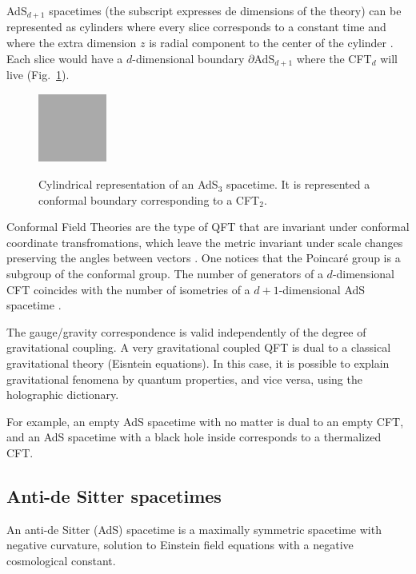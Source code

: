 \documentclass[twocolumn]{revtex4}
\begin{document}
AdS$_{d+1}$ spacetimes (the subscript expresses de dimensions of the theory) can be represented as cylinders where every slice corresponds to a constant time and where the extra dimension $z$ is radial component to the center of the cylinder \cite{}. Each slice would have a $d$-dimensional boundary $\partial$AdS$_{d+1}$ where the CFT$_d$ will live (Fig.~\ref{fig:AdS}).

\begin{figure}
    \centering
    \includegraphics[width=0.2\textwidth]{../Imatges/empty.png}
\label{fig:AdS}
\caption{Cylindrical representation of an AdS$_3$ spacetime. It is represented a conformal boundary corresponding to a CFT$_2$.}
\end{figure}

Conformal Field Theories are the type of QFT that are invariant under conformal coordinate transfromations, which leave the metric invariant under scale changes preserving the angles between vectors \cite{ginsparg_applied_1988}. One notices that the Poincaré group is a subgroup of the conformal group. The number of generators of a $d$-dimensional CFT coincides with the number of isometries of a $d+1$-dimensional AdS spacetime \cite{}.

The gauge/gravity correspondence is valid independently of the degree of gravitational coupling. A very gravitational coupled QFT is dual to a classical gravitational theory (Eisntein equations). In this case, it is possible to explain gravitational fenomena by quantum properties, and vice versa, using the holographic dictionary.

For example, an empty AdS spacetime with no matter is dual to an empty CFT, and an AdS spacetime with a black hole inside corresponds to a thermalized CFT.



\newpage

\subsection{Anti-de Sitter spacetimes} \label{ss:AdS}

An anti-de Sitter (AdS) spacetime is a maximally symmetric spacetime with negative curvature, solution to Einstein field equations with a negative cosmological constant.
\end{document}
